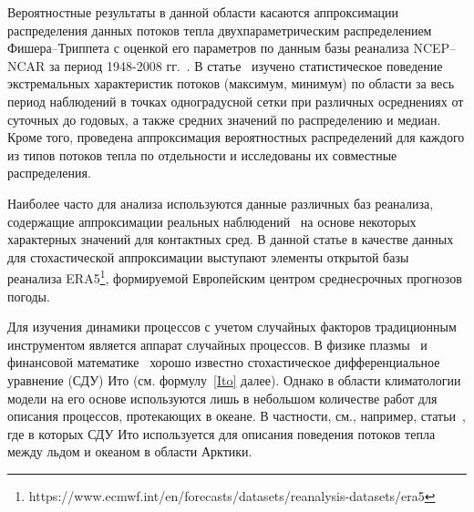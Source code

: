 
Вероятностные результаты в данной области касаются аппроксимации распределения данных потоков тепла двухпараметрическим распределением Фишера--Триппета с оценкой его параметров по данным базы реанализа NCEP--NCAR за период 1948-2008 гг.~\cite{gulev2012probability}. В статье~\cite{FAO} изучено статистическое поведение экстремальных характеристик потоков (максимум, минимум) по области за весь период наблюдений в точках одноградусной сетки при различных осреднениях от суточных до годовых, а также средних значений по распределению и медиан. Кроме того, проведена аппроксимация вероятностных распределений для каждого из типов потоков тепла по отдельности и исследованы их совместные распределения.

Наиболее часто для анализа используются данные различных баз реанализа, содержащие аппроксимации реальных наблюдений~\cite{cronin2019air,leyba2019trends} на основе некоторых характерных значений для контактных сред. В данной статье в качестве данных для стохастической аппроксимации выступают элементы открытой базы реанализа ERA5\footnote{https://www.ecmwf.int/en/forecasts/datasets/reanalysis-datasets/era5}, формируемой Европейским центром среднесрочных прогнозов погоды.

Для изучения динамики процессов с учетом случайных факторов традиционным инструментом является аппарат случайных процессов. В физике плазмы~\cite{Espinos2018,Sexty2019} и финансовой математике~\cite{Bouchaud1998} хорошо известно стохастическое дифференциальное уравнение (СДУ) Ито (см. формулу~\eqref{Ito} далее). Однако в области климатологии модели на его основе используются лишь в небольшом количестве работ для описания процессов, протекающих в океане. В частности, см., например, статьи~\cite{van2021characterisation,toppaladoddi2021stochastic}, где в которых СДУ Ито используется для описания поведения потоков тепла между льдом и океаном в области Арктики.

